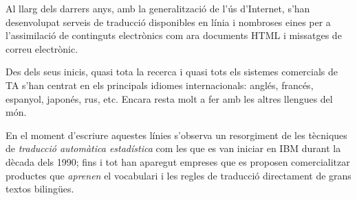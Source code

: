 Al llarg dels darrers anys, amb la generalització de l'ús
d'Internet, s'han desenvolupat serveis de traducció 
disponibles en línia i nombroses eines per a l'assimilació 
de continguts electrònics com ara documents HTML i missatges de
correu electrònic.

Des dels seus inicis, quasi tota la recerca i quasi tots els 
sistemes comercials de TA s'han centrat en els principals 
idiomes internacionals: anglés, francés, espanyol, japonés, rus, etc.
Encara resta molt a fer amb les 
altres llengues del món.

En el moment d'escriure aquestes línies s'observa un resorgiment de
les tècniques de \emph{traducció automàtica estadística} com les que
es van iniciar en IBM durant la dècada dels 1990; fins i tot han
aparegut empreses que es proposen comercialitzar productes que
\emph{aprenen} el vocabulari i les regles de traducció directament de
grans textos bilingües.
